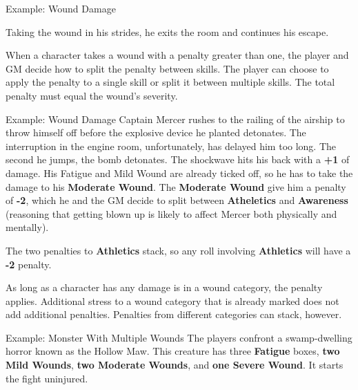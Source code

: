 \begin{multicols}{2}
\begin{Example}{Example: Wound Damage}
	\vspace{0.5\baselineskip}
	\DamageBox[fatigue=3,mild=1,mildtext=\textbf{Athletics (-1)}]

	Taking the wound in his strides, he exits the room and continues his escape.
\end{Example}

When a character takes a wound with a penalty greater than one, the player and GM decide how to split the penalty between skills. The player can choose to apply the penalty to a single skill or split it between multiple skills. The total penalty must equal the wound's severity.

\begin{Example}{Example: Wound Damage}
	Captain Mercer rushes to the railing of the airship to throw himself off before the explosive device he planted detonates. The interruption in the engine room, unfortunately, has delayed him too long. The second he jumps, the bomb detonates. The shockwave hits his back with a \textbf{+1} of damage. His Fatigue and Mild Wound are already ticked off, so he has to take the damage to his \textbf{Moderate Wound}. The \textbf{Moderate Wound} give him a penalty of \textbf{-2}, which he and the GM decide to split between \textbf{Atheletics} and \textbf{Awareness} (reasoning that getting blown up is likely to affect Mercer both physically and mentally).
	
	\vspace{0.5\baselineskip}
	\DamageBox[%
		fatigue=3,%
		mild=1,%
		mildtext=\textbf{Athletics (-1)},%
		moderate=1,%
		moderatetext=\textbf{Athletics (-1), Awareness (-1)}%
	]
	
	\noindent
	The two penalties to \textbf{Athletics} stack, so any roll involving \textbf{Athletics} will have a \textbf{-2} penalty.
\end{Example}

As long as a character has any damage is in a wound category, the penalty applies. Additional stress to a wound category that is already marked does not add additional penalties. Penalties from different categories can stack, however.

\begin{Example}{Example: Monster With Multiple Wounds}
	The players confront a swamp-dwelling horror known as the Hollow Maw. This creature has three \textbf{Fatigue} boxes, \textbf{two Mild Wounds}, \textbf{two Moderate Wounds}, and \textbf{one Severe Wound}. It starts the fight uninjured.

	\vspace{0.5\baselineskip}
	\DamageBox[%
		totalfatigue=3,%
		totalmild=2,%
		totalmoderate=2,%
		totalsevere=1%
	]


\end{Example}
\end{multicols}
